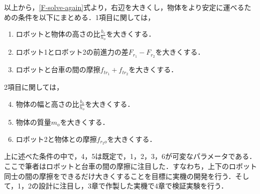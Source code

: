 以上から，\eqref{F-solve-again}式より，右辺を大きくし，物体をより安定に運べるための条件を以下にまとめる．1項目に関しては，
\begin{enumerate}
    \item ロボットと物体の高さの比$\frac{h_{r}}{h_{o}}$を大きくする．
    \item ロボット1とロボット2の前進力の差$F_{r_{1}}-F_{r_{2}}$を大きくする．
    \item ロボットと台車の間の摩擦$f_{t{r_1}}+f_{t{r_2}}$を大きくする． 
\end{enumerate}
2項目に関しては，
\begin{enumerate}
    \setcounter{enumi}{3}
    \item 物体の幅と高さの比$\frac{b_{o}}{h_{o}}$を大きくする．
    \item 物体の質量$m_{o}$を大きくする．
    \item ロボット2と物体との摩擦$f_{r_2 o}$を大きくする．  
\end{enumerate}
上に述べた条件の中で，4，5は既定で，1，2，3，6が可変なパラメータである．ここで筆者はロボットと台車の間の摩擦に注目した．すなわち，上下のロボット同士の間の摩擦をできるだけ大きくすることを目標に実機の開発を行う．そして，1，2の設計に注目し，3章で作製した実機で4章で検証実験を行う．
